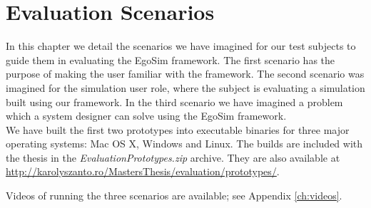 \chapter{Evaluation Scenarios}\label{ch:evaluation_scenarios}
In this chapter we detail the scenarios we have imagined for our test subjects to guide them in evaluating the EgoSim framework. The first scenario has the purpose of making the user familiar with the framework. The second scenario was imagined for the simulation user role, where the subject is evaluating a simulation built using our framework. In the third scenario we have imagined a problem which a system designer can solve using the EgoSim framework.\\

We have built the first two prototypes into executable binaries for three major operating systems: Mac OS X, Windows and Linux. The builds are included with the thesis in the \emph{EvaluationPrototypes.zip} archive. They are also available at \url{http://karolyszanto.ro/MastersThesis/evaluation/prototypes/}.

Videos of running the three scenarios are available; see Appendix \ref{ch:videos}.\\



